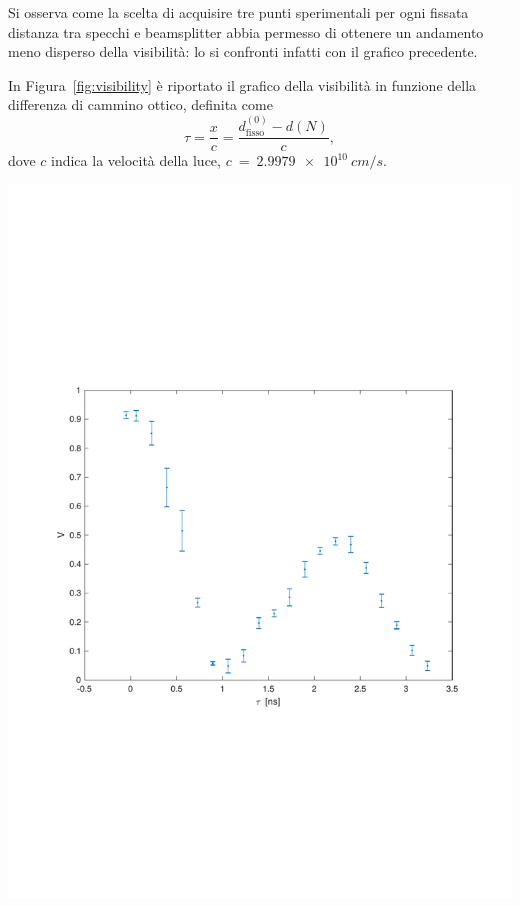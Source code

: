 \documentclass[10pt,oneside,a4paper]{article}
\newenvironment{Figure}
  {\par\medskip\noindent\minipage{\linewidth}}
  {\endminipage\par\medskip}
\begin{document}
\begin{multicols}{2}
Si osserva come la scelta di acquisire tre punti sperimentali per ogni fissata distanza tra specchi e beamsplitter abbia permesso di ottenere un andamento meno disperso della visibilità: lo si confronti infatti con il grafico precedente.

In Figura~\ref{fig:visibility} è riportato il grafico della visibilità in funzione della differenza di cammino ottico, definita come 
\[
\tau = \frac{x}{c} =  \frac{d^{(0)}_\mathrm{fisso} - d(N)}{c},
\] 
dove $c$ indica la velocità della luce, $c~=~\SI{2.9979e10}{cm/s}$.

\begin{Figure}
	\begin{center}
	\includegraphics[width=\linewidth]{V_vs_tau.pdf}
	\label{fig:visibility}
	\end{center}
\end{Figure}


\end{multicols}
\end{document}
